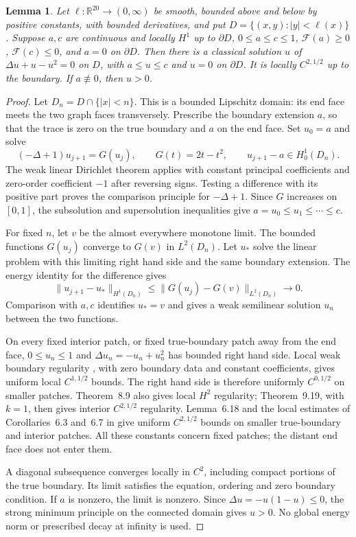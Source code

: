 \documentclass[11pt]{article}
\newtheorem{lemma}[theorem]{Lemma}
\newcommand{\R}{\mathbb R}
\newcommand{\F}{\mathcal F}
\begin{document}
\begin{lemma}\label{lem:existence}
Let $\ell:\R^{20}\to(0,\infty)$ be smooth, bounded above and below by positive
constants, with bounded derivatives, and put
$D=\{(x,y):|y|<\ell(x)\}$.
Suppose $a,c$ are continuous and locally $H^1$ up to $\partial D$,
$0\leq a\leq c\leq1$, $\F(a)\geq0$, $\F(c)\leq0$, and $a=0$ on $\partial D$.
Then there is a classical solution $u$ of
$\Delta u+u-u^2=0$ on $D$, with $a\leq u\leq c$ and $u=0$ on $\partial D$.
It is locally $C^{2,1/2}$ up to the boundary. If $a\not\equiv0$, then $u>0$.
\end{lemma}

\begin{proof}
Let $D_n=D\cap\{|x|<n\}$. This is a bounded Lipschitz domain: its end face
meets the two graph faces transversely. Prescribe the boundary extension $a$,
so that the trace is zero on the true boundary and $a$ on the end face.
Set $u_0=a$ and solve
\begin{equation}\label{eq:iteration}
 (-\Delta+1)u_{j+1}=G(u_j),\qquad G(t)=2t-t^2,
 \qquad u_{j+1}-a\in H^1_0(D_n).
\end{equation}
The weak linear Dirichlet theorem \cite[Theorem~8.9]{GT} applies with
constant principal coefficients and zero-order coefficient $-1$ after
reversing signs. Testing a difference with its positive part proves the
comparison principle for $-\Delta+1$. Since $G$ increases on $[0,1]$,
the subsolution and supersolution inequalities give
$a=u_0\leq u_1\leq\cdots\leq c$.

For fixed $n$, let $v$ be the almost everywhere monotone limit.
The bounded functions $G(u_j)$ converge to $G(v)$ in $L^2(D_n)$.
Let $u_*$ solve the linear problem with this limiting right hand side and
the same boundary extension. The energy identity for the difference gives
\[
 \|u_{j+1}-u_*\|_{H^1(D_n)}
 \leq\|G(u_j)-G(v)\|_{L^2(D_n)}\longrightarrow0.
\]
Comparison with $a,c$ identifies $u_*=v$ and gives a weak semilinear solution
$u_n$ between the two functions.

On every fixed interior patch, or fixed true-boundary patch away from the
end face, $0\leq u_n\leq1$ and
$\Delta u_n=-u_n+u_n^2$ has bounded right hand side.
Local weak boundary regularity \cite[Corollary~8.36]{GT}, with zero boundary
data and constant coefficients, gives uniform local $C^{1,1/2}$ bounds.
The right hand side is therefore uniformly $C^{0,1/2}$ on smaller patches.
Theorem~8.9 also gives local $H^2$ regularity; Theorem~9.19, with $k=1$,
then gives interior $C^{2,1/2}$ regularity. Lemma~6.18 and the local estimates
of Corollaries~6.3 and~6.7 in \cite{GT} give uniform $C^{2,1/2}$ bounds on
smaller true-boundary and interior patches. All these constants concern fixed
patches; the distant end face does not enter them.

A diagonal subsequence converges locally in $C^2$, including compact portions
of the true boundary. Its limit satisfies the equation, ordering and zero
boundary condition. If $a$ is nonzero, the limit is nonzero. Since
$\Delta u=-u(1-u)\leq0$, the strong minimum principle on the connected domain
gives $u>0$. No global energy norm or prescribed decay at infinity is used.
\end{proof}
\end{document}
